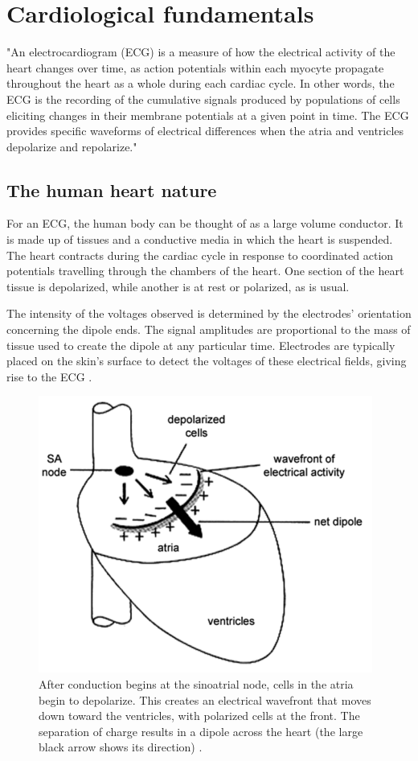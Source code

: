 \chapter{Cardiological fundamentals} \label{chap2}

\cite{ecg1} "An electrocardiogram (ECG) is a measure of how the electrical activity of the heart changes over time, as action potentials within each myocyte propagate throughout the heart as a whole during each cardiac cycle. In other words, the ECG is the recording of the cumulative signals produced by populations of cells eliciting changes in their membrane potentials at a given point in time. The ECG provides specific waveforms of electrical differences when the atria and ventricles depolarize and repolarize."

\section{The human heart nature} \label{heart_nature}

For an ECG, the human body can be thought of as a large volume conductor. It is made up of tissues and a conductive media in which the heart is suspended. The heart contracts during the cardiac cycle in response to coordinated action potentials travelling through the chambers of the heart. One section of the heart tissue is depolarized, while another is at rest or polarized, as is usual. 

The intensity of the voltages observed is determined by the electrodes' orientation concerning the dipole ends. The signal amplitudes are proportional to the mass of tissue used to create the dipole at any particular time. Electrodes are typically placed on the skin's surface to detect the voltages of these electrical fields, giving rise to the ECG \cite{ecg1}.


\begin{figure}[H]
\centering
\includegraphics[scale=0.7]{img/heart_nature.PNG}
\caption{After conduction begins at the sinoatrial node, cells in the atria begin to depolarize. This creates an electrical wavefront that moves down toward the ventricles, with polarized cells at the front. The separation of charge results in a dipole across the heart (the large black arrow shows its direction) \cite{ecg1}.}
\label{fig:heart_nat}
\end{figure}


